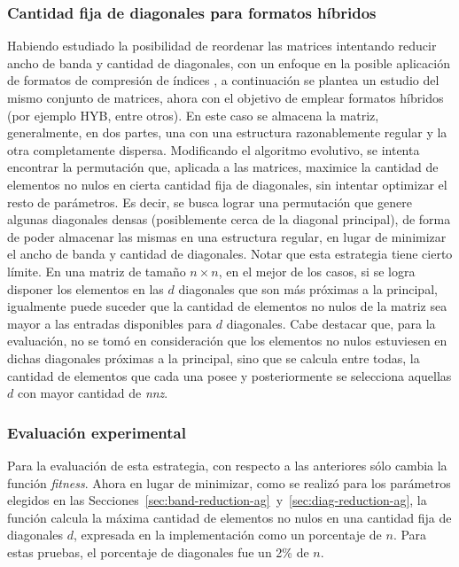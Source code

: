 \subsubsection{Cantidad fija de diagonales para formatos híbridos}\label{sec:diag-perc-reduction}

Habiendo estudiado la posibilidad de reordenar las matrices intentando reducir ancho de banda y cantidad de diagonales, con un enfoque en la posible aplicación de formatos de compresión de índices%
, a continuación se plantea un estudio del mismo conjunto de matrices, ahora con el objetivo de emplear formatos híbridos (por ejemplo HYB, entre otros). En este caso se almacena la matriz, generalmente, en dos partes, una con una estructura razonablemente regular y la otra completamente dispersa. Modificando el algoritmo evolutivo, se intenta encontrar la permutación que, aplicada a las matrices, maximice la cantidad de elementos no nulos en cierta cantidad fija de diagonales, sin intentar optimizar el resto de parámetros. Es decir, se busca lograr una permutación que genere algunas diagonales densas (posiblemente cerca de la diagonal principal), de forma de poder almacenar las mismas en una estructura regular, en lugar de minimizar el ancho de banda y cantidad de diagonales. Notar que esta estrategia tiene cierto límite. En una matriz de tamaño $n\times n$, en el mejor de los casos, si se logra disponer los elementos en las $d$ diagonales que son más próximas a la principal, igualmente puede suceder que la cantidad de elementos no nulos de la matriz sea mayor a las entradas disponibles para $d$ diagonales. Cabe destacar que, para la evaluación, no se tomó en consideración que los elementos no nulos estuviesen en dichas diagonales próximas a la principal, sino que se calcula entre todas, la cantidad de elementos que cada una posee y posteriormente se selecciona aquellas $d$ con mayor cantidad de \textit{nnz}. 

\subsubsection*{Evaluación experimental}

Para la evaluación de esta estrategia, con respecto a las anteriores sólo cambia la función \textit{fitness}. Ahora en lugar de minimizar, como se realizó para los parámetros elegidos en las Secciones~\ref{sec:band-reduction-ag}~y~\ref{sec:diag-reduction-ag}, la función calcula la máxima cantidad de elementos no nulos en una cantidad fija de diagonales $d$, expresada en la implementación como un porcentaje de $n$. 
Para estas pruebas, el porcentaje de diagonales fue un 2\% de $n$. 

